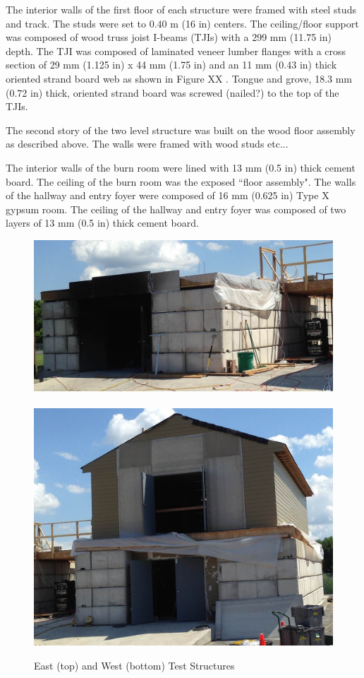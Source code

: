 \documentclass[12pt,oneside]{book}
\begin{document}
The interior walls of the first floor of each structure were framed with steel studs and track.  The studs were set to 0.40 m (16 in) centers.  The ceiling/floor support was composed of wood truss joist I-beams (TJIs) with a 299 mm (11.75 in) depth.  The TJI was composed of laminated veneer lumber flanges with a cross section of 29 mm (1.125 in) x 44 mm (1.75 in) and an 11 mm (0.43 in) thick oriented strand board web as shown in Figure  XX .  Tongue and grove, 18.3 mm (0.72 in) thick, oriented strand board was screwed (nailed?) to the top of the TJIs.

The second story of the two level structure was built on the wood floor assembly as described above. The walls were framed with wood studs etc...

The interior walls of the burn room were lined with 13 mm (0.5 in) thick cement board.  The ceiling of the burn room was the exposed ``floor assembly".  The walls of the hallway and entry foyer were composed of 16 mm (0.625 in) Type X gypsum room. The ceiling of the hallway and entry foyer was composed of two layers of 13 mm (0.5 in) thick cement board.  

\begin{figure}[!ht]
\includegraphics[width=6in]{../Pictures/east_structure}
\\~\\
\includegraphics[width=6in]{../Pictures/west_structure}
\caption[East and West Test Structures]{East (top) and West (bottom) Test Structures}
\label{fig:struct_pics}
\end{figure}
\end{document}
